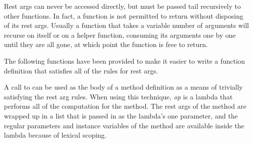 
Rest args can never be accessed directly, but must be passed tail
recursively to other functions.  In fact, a function is not permitted
to return without disposing of its rest args.  Usually a function that
takes a variable number of arguments will recurse on itself or on a
helper function, consuming its arguments one by one until they are all
gone, at which point the function is free to return.

The following functions have been provided to make it easier to write a
function definition that satisfies all of the rules for rest args.



A call to  can be used as the body of a
method definition as a means of trivially satisfying the rest arg
rules.  When using this technique, {\em op} is a lambda that performs
all of the computation for the method.  The rest args of the method
are wrapped up in a list that is passed in as the lambda's one
parameter, and the regular parameters and instance variables of the
method are available inside the lambda because of lexical scoping.
